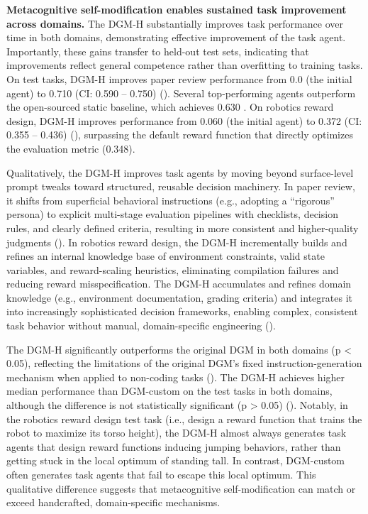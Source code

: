 \documentclass[]{fairmeta}
\begin{document}
\textbf{Metacognitive self-modification enables sustained task improvement across domains.} The DGM-H substantially improves task performance over time in both domains, demonstrating effective improvement of the task agent. Importantly, these gains transfer to held-out test sets, indicating that improvements reflect general competence rather than overfitting to training tasks. On test tasks, DGM-H improves paper review performance from 0.0 (the initial agent) to 0.710 (CI: 0.590 -- 0.750) (). Several top-performing agents outperform the open-sourced static baseline, which achieves 0.630 \citep{yamada2025ai}. On robotics reward design, DGM-H improves performance from 0.060 (the initial agent) to 0.372 (CI: 0.355 -- 0.436) (), surpassing the default reward function that directly optimizes the evaluation metric (0.348).

Qualitatively, the DGM-H improves task agents by moving beyond surface-level prompt tweaks toward structured, reusable decision machinery. In paper review, it shifts from superficial behavioral instructions (e.g., adopting a ``rigorous'' persona) to explicit multi-stage evaluation pipelines with checklists, decision rules, and clearly defined criteria, resulting in more consistent and higher-quality judgments (). In robotics reward design, the DGM-H incrementally builds and refines an internal knowledge base of environment constraints, valid state variables, and reward-scaling heuristics, eliminating compilation failures and reducing reward misspecification. The DGM-H accumulates and refines domain knowledge (e.g., environment documentation, grading criteria) and integrates it into increasingly sophisticated decision frameworks, enabling complex, consistent task behavior without manual, domain-specific engineering ().

The DGM-H significantly outperforms the original DGM in both domains (p < 0.05), reflecting the limitations of the original DGM's fixed instruction-generation mechanism when applied to non-coding tasks (). The DGM-H achieves higher median performance than DGM-custom on the test tasks in both domains, although the difference is not statistically significant (p > 0.05) (). Notably, in the robotics reward design test task (i.e., design a reward function that trains the robot to maximize its torso height), the DGM-H almost always generates task agents that design reward functions inducing jumping behaviors, rather than getting stuck in the local optimum of standing tall. In contrast, DGM-custom often generates task agents that fail to escape this local optimum. This qualitative difference suggests that metacognitive self-modification can match or exceed handcrafted, domain-specific mechanisms.
\end{document}

